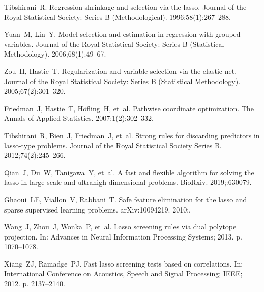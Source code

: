 \documentclass[]{interact}
\theoremstyle{plain}%
\theoremstyle{definition}
\theoremstyle{remark}
\begin{document}

\begin{thebibliography}{10}
\providecommand{\url}[1]{\normalfont{#1}}
\providecommand{\urlprefix}{Available from: }

Tibshirani~R. Regression shrinkage and selection via the lasso. Journal of the
  Royal Statistical Society: Series B (Methodological).
  1996;\hspace{0pt}58(1):267--288.

Yuan~M, Lin~Y. Model selection and estimation in regression with grouped
  variables. Journal of the Royal Statistical Society: Series B (Statistical
  Methodology). 2006;\hspace{0pt}68(1):49--67.

Zou~H, Hastie~T. Regularization and variable selection via the elastic net.
  Journal of the Royal Statistical Society: Series B (Statistical Methodology).
  2005;\hspace{0pt}67(2):301--320.

Friedman~J, Hastie~T, H{\"o}fling~H, et~al. Pathwise coordinate optimization.
  The Annals of Applied Statistics. 2007;\hspace{0pt}1(2):302--332.

Tibshirani~R, Bien~J, Friedman~J, et~al. Strong rules for discarding predictors
  in lasso-type problems. Journal of the Royal Statistical Society Series B.
  2012;\hspace{0pt}74(2):245--266.

Qian~J, Du~W, Tanigawa~Y, et~al. A fast and flexible algorithm for solving the
  lasso in large-scale and ultrahigh-dimensional problems. BioRxiv.
  2019;\hspace{0pt}:630079.

Ghaoui~LE, Viallon~V, Rabbani~T. Safe feature elimination for the lasso and
  sparse supervised learning problems. arXiv:10094219. 2010;\hspace{0pt}.

Wang~J, Zhou~J, Wonka~P, et~al. Lasso screening rules via dual polytope
  projection. In: Advances in Neural Information Processing Systems; 2013. p.
  1070--1078.

Xiang~ZJ, Ramadge~PJ. Fast lasso screening tests based on correlations. In:
  International Conference on Acoustics, Speech and Signal Processing; IEEE;
  2012. p. 2137--2140.


\end{thebibliography}
\end{document}
